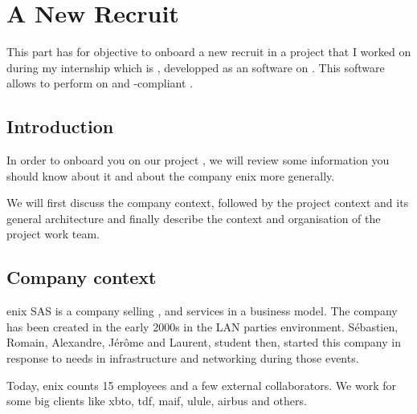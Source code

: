 \chapter{A New Recruit}


This part has for objective to onboard a new recruit in a project that I worked on during my internship which is \saniscsicsi, developped as an  software on . This software allows to perform  on  and -compliant .

\clearpage

\section{Introduction}

In order to onboard you on our project \saniscsicsi, we will review some information you should know about it and about the company \gls{enix} more generally.

We will first discuss the company context, followed by the project context and its general architecture and finally describe the context and organisation of the project work team.

\section{Company context}

\gls{enix} SAS is a company selling ,  and  services in a  business model. The company has been created in the early 2000s in the LAN parties environment. Sébastien, Romain, Alexandre, Jérôme and Laurent, student then, started this company in response to needs in infrastructure and networking during those events.

Today, \gls{enix} counts 15 employees and a few external collaborators. We work for some big clients like \gls{xbto}, \gls{tdf}, \gls{maif}, \gls{ulule}, \gls{airbus} and others.

